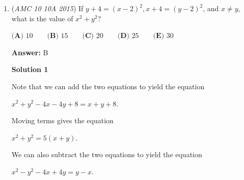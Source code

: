 \begin{enumerate}
 We found one valid solution so the answer is $\boxed{\textbf{(B) }1}$.

 



\textbf{Solution 2}

The condition required is $\frac{x+1}{y+1}=\frac{11}{10}\cdot\frac{x}{y}$.

 Observe that $x+1 > \frac{11}{10}\cdot x$ so $x$ is at most $9.$

 By multiplying by $\frac{y+1}{x}$ and simplifying we can rewrite the condition as $y=\frac{11x}{10-x}$.  Since $x$ and $y$ are integer, this only has solutions for $x\in\{5,8,9\}$.  However, only the first yields a $y$ that is relative prime to $x$.

 There is only one valid solution so the answer is $\boxed{\textbf{(B) }1}$




\textbf{Solution 3}

So from this question, we can get \(\frac{x+1}{y+1} = \frac{11x}{10y}\). We can transform this equation into \(x + 11 \cdot \left( \frac{x}{y} \right) = 10\). Two numbers are added to get 10, and one of them, \(x\), is a positive and prime integer. So the other number also has to be a positive integer. Therefore, \(11 \cdot \left( \frac{x}{y} \right)\) is a positive integer. The only possibility of this being true is when \(y\) and 11 cancel out, leaving a singular \(x\). So \(y = 11\) and \(x + x = 10\). Therefore, \(y = 11\) and \(x = 5\).

 


	\item (\textit{AMC 10 10A 2015}) If $y+4 = (x-2)^2, x+4 = (y-2)^2$, and $x \neq y$, what is the value of $x^2+y^2$?


 $\textbf{(A) }10\qquad\textbf{(B) }15\qquad\textbf{(C) }20\qquad\textbf{(D) }25\qquad\textbf{(E) }\text{30}$

 \textbf{Answer: }B



\textbf{Solution 1}

Note that we can add the two equations to yield the equation

 $x^2 + y^2 - 4x - 4y + 8 = x + y + 8.$

 Moving terms gives the equation

 $x^2+y^2=5 \left( x + y \right).$

 We can also subtract the two equations to yield the equation

 $x^2 - y^2 - 4x +4y = y - x.$


\end{enumerate}
